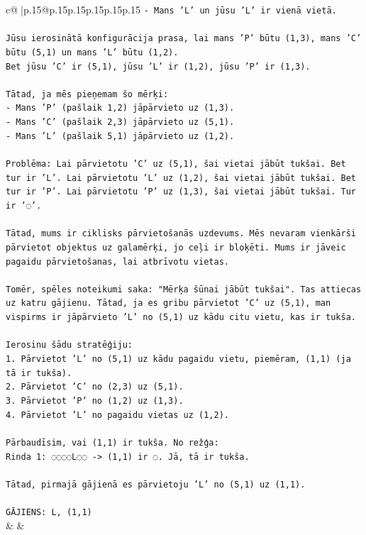 \documentclass{article}
\begin{document}
{\begin{supertabular}{c@{$\;$}|p{.15\linewidth}@{}p{.15\linewidth}p{.15\linewidth}p{.15\linewidth}p{.15\linewidth}p{.15\linewidth}}
{{{\texttt{{-} Mans 'L' un jūsu 'L' ir vienā vietā.} \\
\\ 
\texttt{Jūsu ierosinātā konfigurācija prasa, lai mans 'P' būtu (1,3), mans 'C' būtu (5,1) un mans 'L' būtu (1,2).} \\
\texttt{Bet jūsu 'C' ir (5,1), jūsu 'L' ir (1,2), jūsu 'P' ir (1,3).} \\
\\ 
\texttt{Tātad, ja mēs pieņemam šo mērķi:} \\
\texttt{{-} Mans 'P' (pašlaik 1,2) jāpārvieto uz (1,3).} \\
\texttt{{-} Mans 'C' (pašlaik 2,3) jāpārvieto uz (5,1).} \\
\texttt{{-} Mans 'L' (pašlaik 5,1) jāpārvieto uz (1,2).} \\
\\ 
\texttt{Problēma: Lai pārvietotu 'C' uz (5,1), šai vietai jābūt tukšai. Bet tur ir 'L'. Lai pārvietotu 'L' uz (1,2), šai vietai jābūt tukšai. Bet tur ir 'P'. Lai pārvietotu 'P' uz (1,3), šai vietai jābūt tukšai. Tur ir '◌'.} \\
\\ 
\texttt{Tātad, mums ir ciklisks pārvietošanās uzdevums. Mēs nevaram vienkārši pārvietot objektus uz galamērķi, jo ceļi ir bloķēti. Mums ir jāveic pagaidu pārvietošanas, lai atbrīvotu vietas.} \\
\\ 
\texttt{Tomēr, spēles noteikumi saka: "Mērķa šūnai jābūt tukšai". Tas attiecas uz katru gājienu. Tātad, ja es gribu pārvietot 'C' uz (5,1), man vispirms ir jāpārvieto 'L' no (5,1) uz kādu citu vietu, kas ir tukša.} \\
\\ 
\texttt{Ierosinu šādu stratēģiju:} \\
\texttt{1. Pārvietot 'L' no (5,1) uz kādu pagaidu vietu, piemēram, (1,1) (ja tā ir tukša).} \\
\texttt{2. Pārvietot 'C' no (2,3) uz (5,1).} \\
\texttt{3. Pārvietot 'P' no (1,2) uz (1,3).} \\
\texttt{4. Pārvietot 'L' no pagaidu vietas uz (1,2).} \\
\\ 
\texttt{Pārbaudīsim, vai (1,1) ir tukša. No režģa:} \\
\texttt{Rinda 1: ◌◌◌◌L◌◌ {-}> (1,1) ir ◌. Jā, tā ir tukša.} \\
\\ 
\texttt{Tātad, pirmajā gājienā es pārvietoju 'L' no (5,1) uz (1,1).} \\
\\ 
\texttt{GĀJIENS: L, (1,1)} \\
            }
        }
    }
    & & \\ \\


\end{supertabular}}
\end{document}
